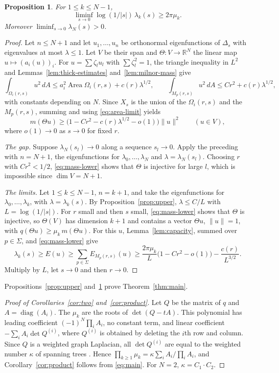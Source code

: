 \documentclass[11pt]{amsart}
\newtheorem{proposition}[theorem]{Proposition}
\theoremstyle{definition}
\theoremstyle{remark}
\newcommand{\RR}{\mathbb R}
\newcommand{\area}{\operatorname{Area}}
\begin{document}
\begin{proposition}\label{prop:lower}
For $1\le k\le N-1$,
\[
 \liminf_{s\to0}\log(1/|s|)\,\lambda_k(s)\ge2\pi\mu_k .
\]
Moreover
$\liminf_{s\to0}\lambda_N(s)>0$.
\end{proposition}
\begin{proof}
Let $n\le N+1$ and let $u_1,\ldots,u_n$ be orthonormal eigenfunctions of
$\Delta_s$ with eigenvalues at most $\lambda\le1$. Let $V$ be their span
and $\Theta:V\to\RR^N$ the linear map $u\mapsto(a_i(u))_i$. For
$u=\sum \zeta_lu_l$ with $\sum \zeta_l^2=1$, the triangle inequality in $L^2$ and
Lemmas~\ref{lem:thick-estimates} and~\ref{lem:milnor-mass} give
\[
 \int_{\Omega_i(r,s)}u^2\,dA\le a_i^2\area\Omega_i(r,s)
 +c(r)\lambda^{1/2},\qquad
 \int_{M_p(r,s)}u^2\,dA\le C r^2+c(r)\lambda^{1/2},
\]
with constants depending on $N$. Since $X_s$ is the union of the
$\Omega_i(r,s)$ and the $M_p(r,s)$, summing and using
\eqref{eq:area-limit} yields
\begin{equation}\label{eq:mass-lower}
 m(\Theta u)\ge\bigl(1-Cr^2-c(r)\lambda^{1/2}-o(1)\bigr)\|u\|^2
 \qquad(u\in V),
\end{equation}
where $o(1)\to0$ as $s\to0$ for fixed $r$.

\emph{The gap.} Suppose $\lambda_N(s_l)\to0$ along a sequence
$s_l\to0$. Apply the preceding with $n=N+1$, the eigenfunctions for
$\lambda_0,\ldots,\lambda_N$ and $\lambda=\lambda_N(s_l)$. Choosing $r$
with $Cr^2<1/2$, \eqref{eq:mass-lower} shows that $\Theta$ is injective for
large $l$, which is impossible since $\dim V=N+1$.

\emph{The limits.} Let $1\le k\le N-1$, $n=k+1$, and take the
eigenfunctions for $\lambda_0,\ldots,\lambda_k$, with
$\lambda=\lambda_k(s)$. By Proposition~\ref{prop:upper},
$\lambda\le C/L$ with $L=\log(1/|s|)$. For $r$ small and then $s$ small,
\eqref{eq:mass-lower} shows that $\Theta$ is injective, so $\Theta(V)$ has
dimension $k+1$ and contains a vector $\Theta u$, $\|u\|=1$, with
$q(\Theta u)\ge\mu_k\,m(\Theta u)$. For this $u$,
Lemma~\ref{lem:capacity}, summed over $p\in\Sigma$, and
\eqref{eq:mass-lower} give
\[
 \lambda_k(s)\ge E(u)\ge\sum_{p\in\Sigma}E_{M_p(r,s)}(u)
 \ge\frac{2\pi\mu_k}{L}\bigl(1-Cr^2-o(1)\bigr)
 -\frac{c(r)}{L^{3/2}} .
\]
Multiply by $L$, let $s\to0$ and then $r\to0$.
\end{proof}

Propositions~\ref{prop:upper} and~\ref{prop:lower} prove
Theorem~\ref{thm:main}.

\begin{proof}[Proof of Corollaries~\ref{cor:two} and~\ref{cor:product}]
Let $Q$ be the matrix of $q$ and $A=\operatorname{diag}(A_i)$. The
$\mu_k$ are the roots of $\det(Q-tA)$. This polynomial has leading
coefficient $(-1)^N\prod_iA_i$, no constant term, and linear coefficient
$-\sum_iA_i\det Q^{(i)}$, where $Q^{(i)}$ is obtained by deleting the
$i$th row and column. Since $Q$ is a weighted graph Laplacian, all
$\det Q^{(i)}$ are equal to the weighted number $\kappa$ of spanning trees
\cite{chaiken}. Hence
$\prod_{k\ge1}\mu_k=\kappa\sum_iA_i/\prod_iA_i$, and
Corollary~\ref{cor:product} follows from \eqref{eq:main}. For $N=2$,
$\kappa=C_1\cdot C_2$.
\end{proof}
\end{document}
